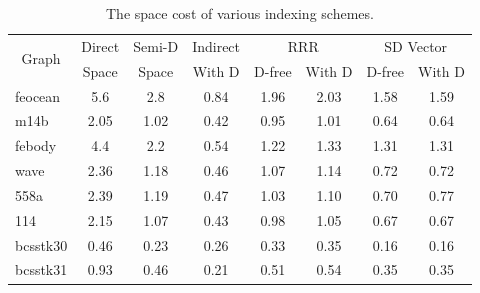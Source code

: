 \documentclass[12pt,glossary]{dalthesis}
\begin{document}
\begin{table}[ht]
\centering
\caption{The space cost of various indexing schemes.}
\label{my-label}
\begin{tabular}{|l||c||c||c||c|c||c|c|}
\hline
\multicolumn{1}{|c||}{\multirow{2}{*}{Graph}} & Direct & Semi-D & Indirect & \multicolumn{2}{c||}{RRR} & \multicolumn{2}{c|}{SD Vector} \\\cline{2-8}
\multicolumn{1}{|c||}{}                       & Space  & Space  & With D   & D-free     & With D     & D-free        & With D        \\ \hline
feocean                                    & 5.6    & 2.8    & 0.84     & 1.96       & 2.03       & 1.58          & 1.59          \\
m14b                                       & 2.05   & 1.02   & 0.42     & 0.95       & 1.01       & 0.64          & 0.64          \\
febody                                     & 4.4    & 2.2    & 0.54     & 1.22       & 1.33       & 1.31          & 1.31          \\
wave                                       & 2.36   & 1.18   & 0.46     & 1.07       & 1.14       & 0.72          & 0.72          \\
558a                                       & 2.39   & 1.19   & 0.47     & 1.03       & 1.10       & 0.70          & 0.77          \\
114                                        & 2.15   & 1.07   & 0.43     & 0.98       & 1.05       & 0.67          & 0.67          \\
bcsstk30                                   & 0.46   & 0.23   & 0.26     & 0.33       & 0.35       & 0.16          & 0.16          \\
bcsstk31                                   & 0.93   & 0.46   & 0.21     & 0.51       & 0.54       & 0.35          & 0.35          \\ \hline
\end{tabular}
\end{table}
\end{document}
